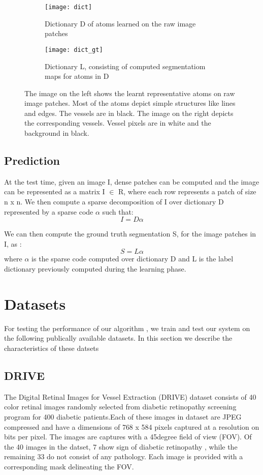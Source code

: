 \begin{figure}
	\begin{subfigure}[b]{0.45\textwidth}
		\texttt{[image: dict]}
		\caption{Dictionary D of atoms learned on the raw image patches}
		\label{fig:dict}
	\end{subfigure}
	\begin{subfigure}[b]{0.45\textwidth}
		\texttt{[image: dict\_gt]}
		\caption{Dictionary L, consisting of computed segmentatiom maps for atoms in D}
		\label{fig:dictgt}
	\end{subfigure}
	\caption[Dictionary of image atoms and segmentations]{The image on the left shows the learnt representative atoms on raw image patches. Most of the atoms depict simple structures like lines and edges. The vessels are in black. The image on the right depicts the corresponding vessels. Vessel pixels are in white and the background in black.}
	\label{fig:dl-cls}
\end{figure}

\subsection{Prediction}
At the test time, given an image I, dense patches can be computed and the image can be represented as a matrix I $\in$ R, where each row represents a patch of size n x n. We then compute a sparse decomposition of I over dictionary D represented by a sparse code $\alpha$ such that:
$$
I = D \alpha
$$

We can then compute the ground truth segmentation S, for the image patches in I, as :
$$
S = L\alpha
$$
where $\alpha$ is the sparse code computed over dictionary D and L is the label dictionary previously computed during the learning phase.

\section{Datasets}
For testing the performance of our algorithm , we train and test our system on the following publically available datasets. In this section we describe the characteristics of these datsets

\subsection{DRIVE}
The Digital Retinal Images for Vessel Extraction (DRIVE) dataset consists of 40 color retinal images randomly selected from diabetic retinopathy screening program for 400 diabetic patients.Each of these images in dataset are JPEG compressed and have a dimensions of 768 x 584 pixels captured at a resolution on bits per pixel. The images are captures with a 45degree field of view (FOV).
Of the 40 images in the datset, 7 show sign of diabetic retinopathy , while the remaining 33 do not consist of any pathology. Each image is provided with a corresponding mask delineating the FOV.\\

